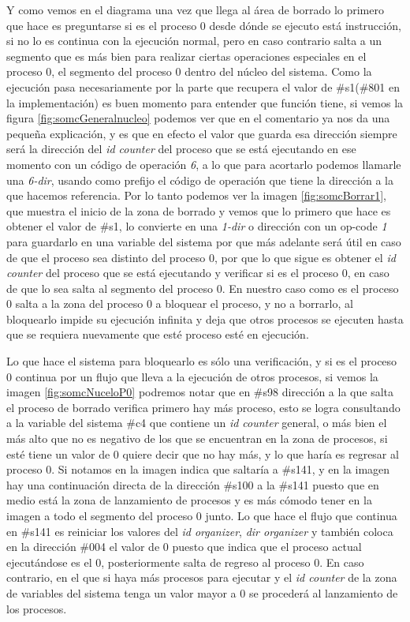\documentclass[letterpaper,12pt,oneside]{book}
\begin{document}
		Y como vemos en el diagrama una vez que llega al área de borrado lo primero que hace es preguntarse si es el proceso
		0 desde dónde se ejecuto está instrucción, si no lo es continua con la ejecución normal, pero en caso contrario salta a un segmento
		que es más bien para realizar ciertas operaciones especiales en el proceso 0, el segmento del proceso 0 dentro del núcleo del sistema. Como
		la ejecución pasa necesariamente por la parte que recupera el valor de \#s1(\#801 en la implementación) es buen momento para entender
		que función tiene, si vemos la figura \ref{fig:somcGeneralnucleo} podemos
		ver que en el comentario ya nos da una pequeña explicación, y es que en efecto el valor que guarda esa dirección siempre será la dirección
		del \textit{id counter} del proceso que se está ejecutando en ese momento con un código de operación \textit{6}, a lo que para acortarlo podemos llamarle
		una \textit{6-dir}, usando como prefijo el código de operación que tiene la dirección a la que hacemos referencia. Por lo tanto podemos ver la
		imagen \ref{fig:somcBorrar1}, que muestra el inicio de la zona de borrado y vemos que lo primero que hace es obtener el valor de \#s1, lo convierte
		en una \textit{1-dir} o dirección con un op-code \textit{1}  para guardarlo en una variable del sistema por que más adelante será útil en caso
		de que el proceso sea distinto del proceso 0, por que lo que sigue es obtener el \textit{id counter} del proceso que se está ejecutando y verificar si es el proceso
		0, en caso de que lo sea salta al segmento del proceso 0. En nuestro caso como es el proceso 0 salta a la zona del proceso 0 a bloquear el proceso, y no 
		a borrarlo, al bloquearlo impide su ejecución infinita y deja que otros procesos se ejecuten hasta que se requiera nuevamente que esté proceso esté en ejecución.
		
		Lo que hace el sistema para bloquearlo es sólo una verificación, y si es el proceso 0 continua por un flujo que lleva a la ejecución de otros procesos,
		si vemos la imagen \ref{fig:somcNuceloP0} podremos notar que en \#s98 dirección a la que salta el proceso de borrado verifica primero hay más proceso, esto
		se logra consultando a la variable del sistema \#c4 que contiene un \textit{id counter} general, o más bien el más alto que no es negativo de los que
		se encuentran en la zona de procesos, si esté tiene un valor de 0 quiere decir que no hay más, y lo que haría es regresar al proceso 0. Si notamos en la imagen
		indica que saltaría a \#s141, y en la imagen hay una continuación directa de la dirección \#s100 a la \#s141 puesto que en medio está la zona
		de lanzamiento de procesos y es más cómodo tener en la imagen a todo el segmento del proceso 0 junto. Lo que hace el flujo que continua en
		\#s141 es reiniciar los valores del \textit{id organizer}, \textit{dir organizer} y también coloca en la dirección \#004 el valor de 0 puesto que indica que el
		proceso actual ejecutándose es el 0, posteriormente salta de regreso al proceso 0. En caso contrario, en el que si haya más procesos para ejecutar
		y el \textit{id counter} de la zona de variables del sistema tenga un valor mayor a 0 se procederá al lanzamiento de los procesos.
		
\end{document}
